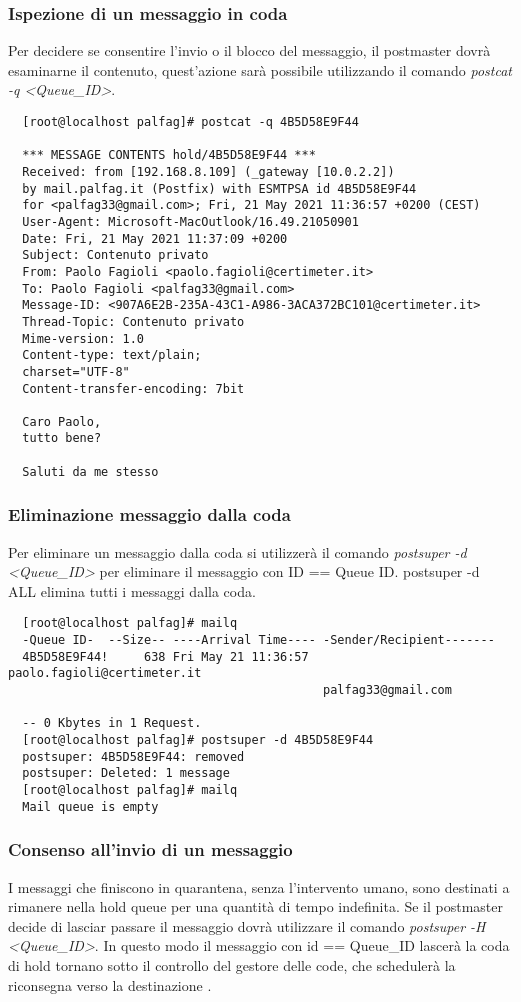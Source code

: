   \newpage
  \subsubsection{Ispezione di un messaggio in coda}
  Per decidere se consentire l'invio o il blocco del messaggio, il postmaster dovrà  esaminarne il contenuto, 
  quest'azione sarà possibile utilizzando il comando \textit{postcat -q <Queue\_ID>}.

  \begin{verbatim}
  [root@localhost palfag]# postcat -q 4B5D58E9F44 

  *** MESSAGE CONTENTS hold/4B5D58E9F44 ***
  Received: from [192.168.8.109] (_gateway [10.0.2.2])
  by mail.palfag.it (Postfix) with ESMTPSA id 4B5D58E9F44
  for <palfag33@gmail.com>; Fri, 21 May 2021 11:36:57 +0200 (CEST)
  User-Agent: Microsoft-MacOutlook/16.49.21050901
  Date: Fri, 21 May 2021 11:37:09 +0200
  Subject: Contenuto privato
  From: Paolo Fagioli <paolo.fagioli@certimeter.it>
  To: Paolo Fagioli <palfag33@gmail.com>
  Message-ID: <907A6E2B-235A-43C1-A986-3ACA372BC101@certimeter.it>
  Thread-Topic: Contenuto privato
  Mime-version: 1.0
  Content-type: text/plain;
  charset="UTF-8"
  Content-transfer-encoding: 7bit

  Caro Paolo,
  tutto bene?

  Saluti da me stesso
  \end{verbatim}
  
  
  \subsubsection{Eliminazione messaggio dalla coda}
  Per eliminare un messaggio dalla coda si utilizzerà il comando \textit{postsuper -d <Queue\_ID>} per eliminare il messaggio con 
  ID == Queue ID.
  postsuper -d ALL elimina tutti i messaggi dalla coda.

  \begin{verbatim}
  [root@localhost palfag]# mailq
  -Queue ID-  --Size-- ----Arrival Time---- -Sender/Recipient-------
  4B5D58E9F44!     638 Fri May 21 11:36:57  paolo.fagioli@certimeter.it
                                            palfag33@gmail.com
  
  -- 0 Kbytes in 1 Request.
  [root@localhost palfag]# postsuper -d 4B5D58E9F44 
  postsuper: 4B5D58E9F44: removed
  postsuper: Deleted: 1 message
  [root@localhost palfag]# mailq
  Mail queue is empty
  \end{verbatim}
  
  
  \subsubsection{Consenso all'invio di un messaggio}
  I messaggi che finiscono in quarantena, senza l'intervento umano, sono destinati a rimanere nella hold queue per una 
  quantità di tempo indefinita. Se il postmaster decide di lasciar passare il messaggio dovrà utilizzare il comando
  \textit{postsuper -H <Queue\_ID>}. In questo modo il messaggio con id == Queue\_ID lascerà la coda di hold tornano sotto il controllo
  del gestore delle code, che schedulerà la riconsegna verso la destinazione \cite{dent2003postfix}.

